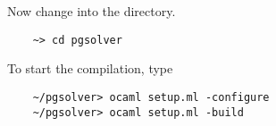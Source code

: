Now change into the \pgsolver directory.
\begin{verbatim}
    ~> cd pgsolver
\end{verbatim}

To start the compilation, type 
\begin{verbatim}
    ~/pgsolver> ocaml setup.ml -configure
    ~/pgsolver> ocaml setup.ml -build

\end{verbatim}
%




